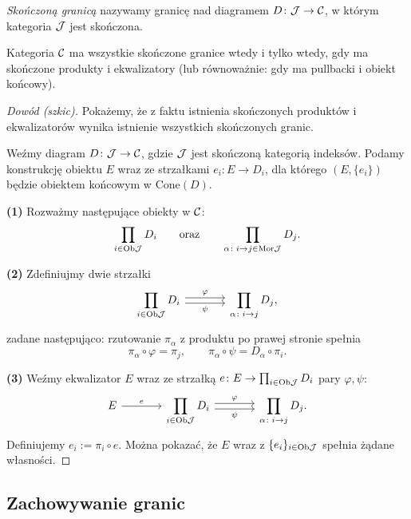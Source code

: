 \begin{definicja}
\emph{Skończoną granicą} nazywamy granicę nad diagramem $D \colon \mathcal{J} \to \mathcal{C}$, w którym kategoria $\mathcal{J}$ jest skończona.
\end{definicja}

\begin{twierdzenie}
Kategoria $\mathcal{C}$ ma wszystkie skończone granice wtedy i tylko wtedy, gdy ma skończone produkty i ekwalizatory (lub równoważnie: gdy ma pullbacki i obiekt końcowy).
\end{twierdzenie}

\begin{proof}[Dowód (szkic)]
Pokażemy, że z faktu istnienia skończonych produktów i ekwalizatorów wynika istnienie wszystkich skończonych granic.

Weźmy diagram $D \colon \mathcal{J} \to \mathcal{C}$, gdzie $\mathcal{J}$ jest skończoną kategorią indeksów. Podamy konstrukcję obiektu $E$ wraz ze strzałkami $e_i \colon E \to D_i$, dla którego $(E, \{e_i\})$ będzie obiektem końcowym w $\mathrm{Cone}(D)$.

\textbf{(1)} Rozważmy następujące obiekty w $\mathcal{C}$:
\[
\prod_{i \in \mathrm{Ob} \mathcal{J}} D_i \qquad \text{oraz} \qquad \prod_{\alpha \colon i \to j \in \mathrm{Mor} \mathcal{J}} D_j.
\]

\textbf{(2)} Zdefiniujmy dwie strzałki
\[
\begin{tikzcd}[column sep=large]
\displaystyle\prod_{i \in \Ob \Jcat} D_i \arrow[r, shift left, "\varphi"] \arrow[r, shift right, "\psi"'] & \displaystyle\prod_{\alpha \colon i \to j} D_j,
\end{tikzcd}
\]
zadane następująco: rzutowanie $\pi_\alpha$ z produktu po prawej stronie spełnia
\[
\pi_\alpha \circ \varphi = \pi_j, \qquad \pi_\alpha \circ \psi = D_\alpha \circ \pi_i.
\]

\textbf{(3)} Weźmy ekwalizator $E$ wraz ze strzałką $e \colon E \to \prod_{i \in \mathrm{Ob} \mathcal{J}} D_i$ pary $\varphi, \psi$:
\[
\begin{tikzcd}[column sep=large]
E \arrow[r, "e"] & \displaystyle\prod_{i \in \Ob \Jcat} D_i \arrow[r, shift left, "\varphi"] \arrow[r, shift right, "\psi"'] & \displaystyle\prod_{\alpha \colon i \to j} D_j.
\end{tikzcd}
\]
Definiujemy $e_i := \pi_i \circ e$. Można pokazać, że $E$ wraz z $\{e_i\}_{i \in \mathrm{Ob} \mathcal{J}}$ spełnia żądane własności.
\end{proof}

\subsection*{Zachowywanie granic}

